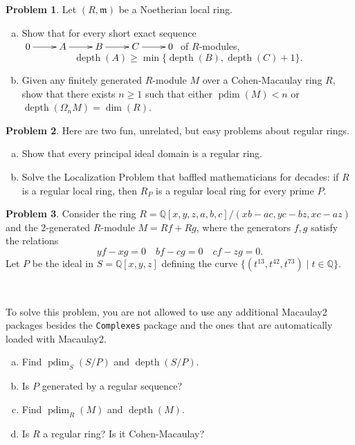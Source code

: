 \documentclass[11pt]{article}
\DeclareMathOperator{\depth}{depth}
\DeclareMathOperator{\pdim}{pdim}
\newcommand{\m}{\mathfrak{m}}
\theoremstyle{definition}
\newtheorem{problem}{Problem}
\begin{document}
\begin{problem}
	Let $(R,\m)$ be a Noetherian local ring.
	\begin{enumerate}[a)]
		\item Show that for every short exact sequence $\xymatrix{0 \ar[r] & A \ar[r] & B \ar[r] & C \ar[r] & 0}$ of $R$-modules,
		$$\depth(A) \geqslant \min \lbrace \depth(B), \depth(C) + 1 \rbrace.$$
		\item Given any finitely generated $R$-module $M$ over a Cohen-Macaulay ring $R$, show that there exists $n \geqslant 1$ such that either $\pdim(M) < n$ or $\depth(\Omega_n M) = \dim(R)$.
	\end{enumerate}
\end{problem}

\vfill

\begin{problem} Here are two fun, unrelated, but easy problems about regular rings.
	\begin{enumerate}[a)]
	\item Show that every principal ideal domain is a regular ring.
	\item Solve the Localization Problem that baffled mathematicians for decades: if $R$ is a regular local ring, then $R_P$ is a regular local ring for every prime $P$.
	\end{enumerate}
\end{problem}

\newpage

\setcounter{problem}{6}

\begin{problem}
	Consider the ring $R = \mathbb{Q}[x,y,z,a,b,c]/(xb-ac,yc-bz,xc-az)$ and the $2$-generated $R$-module $M = Rf + Rg$, where the generators $f, g$ satisfy the relations 
		$$yf-xg = 0 \quad bf - cg = 0 \quad cf - zg = 0.$$
		Let $P$ be the ideal in $S = \mathbb{Q}[x,y,z]$ defining the curve $\lbrace (t^{13},t^{42},t^{73}) \mid t \in \mathbb{Q} \rbrace$.

\

To solve this problem, you are not allowed to use any additional Macaulay2 packages besides the \texttt{Complexes} package and the ones that are automatically loaded with Macaulay2.

\begin{enumerate}[a)]
	\item Find $\pdim_S(S/P)$ and $\depth(S/P)$. 
	\item Is $P$ generated by a regular sequence?
	\item Find $\pdim_R(M)$ and $\depth(M)$.
	\item Is $R$ a regular ring? Is it Cohen-Macaulay?
\end{enumerate}
\end{problem}
\end{document}
